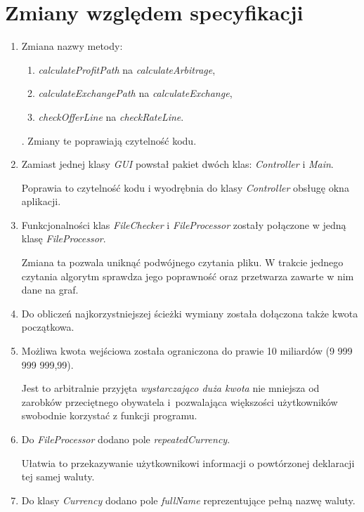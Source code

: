 \documentclass[a4paper,11pt]{article}
\begin{document}
\section{Zmiany względem specyfikacji}
\begin{enumerate}
\item Zmiana nazwy metody:
\begin{enumerate}
\item \textit{calculateProfitPath} na \textit{calculateArbitrage},
\item \textit{calculateExchangePath} na \textit{calculateExchange},
\item \textit{checkOfferLine} na \textit{checkRateLine}.
\end{enumerate}.
Zmiany te poprawiają czytelność kodu.

\item Zamiast jednej klasy \textit{GUI} powstał pakiet dwóch klas: \textit{Controller} i \textit{Main}.

Poprawia to czytelność kodu i wyodrębnia do klasy \textit{Controller} obsługę okna aplikacji.

\item Funkcjonalności klas \textit{FileChecker} i \textit{FileProcessor} zostały połączone w jedną klasę \textit{FileProcessor}.

Zmiana ta pozwala uniknąć podwójnego czytania pliku. W trakcie jednego czytania algorytm sprawdza jego poprawność oraz przetwarza zawarte w nim dane na graf.

\item Do obliczeń najkorzystniejszej ścieżki wymiany została dołączona także kwota początkowa.

\item Możliwa kwota wejściowa została ograniczona do prawie 10 miliardów (9 999 999 999,99).

Jest to arbitralnie przyjęta \textit{wystarczająco duża kwota} nie mniejsza od zarobków przeciętnego obywatela i~pozwalająca większości użytkowników swobodnie korzystać z funkcji programu.

\item Do \textit{FileProcessor} dodano pole \textit{repeatedCurrency}.

Ułatwia to przekazywanie użytkownikowi informacji o powtórzonej deklaracji tej samej waluty.

\item Do klasy \textit{Currency} dodano pole \textit{fullName} reprezentujące pełną nazwę waluty.


\end{enumerate}
\end{document}
